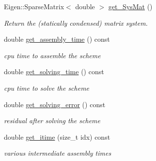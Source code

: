 \begin{DoxyCompactItemize}
Eigen\+::\+Sparse\+Matrix$<$ double $>$ \hyperlink{classHArDCore2D_1_1HHO__Diffusion_a2f9d10916800747ae977e901931309da}{get\+\_\+\+Sys\+Mat} ()
\begin{DoxyCompactList}\small\item\em Return the (statically condensed) matrix system. \end{DoxyCompactList}\item 
\mbox{\label{classHArDCore2D_1_1HHO__Diffusion_a4b67f061d06b1aea5a626792a2bddd1e}} 
double \hyperlink{classHArDCore2D_1_1HHO__Diffusion_a4b67f061d06b1aea5a626792a2bddd1e}{get\+\_\+assembly\+\_\+time} () const
\begin{DoxyCompactList}\small\item\em cpu time to assemble the scheme \end{DoxyCompactList}\item 
\mbox{\label{classHArDCore2D_1_1HHO__Diffusion_a0ba01c42bc116f962b6982b27e95b471}} 
double \hyperlink{classHArDCore2D_1_1HHO__Diffusion_a0ba01c42bc116f962b6982b27e95b471}{get\+\_\+solving\+\_\+time} () const
\begin{DoxyCompactList}\small\item\em cpu time to solve the scheme \end{DoxyCompactList}\item 
\mbox{\label{classHArDCore2D_1_1HHO__Diffusion_ad53ffa4a52af7bf6803e28f36c7e3365}} 
double \hyperlink{classHArDCore2D_1_1HHO__Diffusion_ad53ffa4a52af7bf6803e28f36c7e3365}{get\+\_\+solving\+\_\+error} () const
\begin{DoxyCompactList}\small\item\em residual after solving the scheme \end{DoxyCompactList}\item 
\mbox{\label{classHArDCore2D_1_1HHO__Diffusion_a43051dfce03a9f75c33903f1736f4e1a}} 
double \hyperlink{classHArDCore2D_1_1HHO__Diffusion_a43051dfce03a9f75c33903f1736f4e1a}{get\+\_\+itime} (size\+\_\+t idx) const
\begin{DoxyCompactList}\small\item\em various intermediate assembly times \end{DoxyCompactList}\item 

\end{DoxyCompactItemize}
